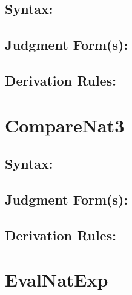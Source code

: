 \documentclass[11pt]{jarticle}
\begin{document}


\subsection*{Syntax:}

\CompareNatiiDisplayBNF

\subsection*{Judgment Form(s):}


\subsection*{Derivation Rules:}
\CompareNatiiDisplayRules

\newpage

\section*{CompareNat3}



\subsection*{Syntax:}

\CompareNatiiiDisplayBNF

\subsection*{Judgment Form(s):}


\subsection*{Derivation Rules:}
\CompareNatiiiDisplayRules

\newpage

\section*{EvalNatExp}


\end{document}
